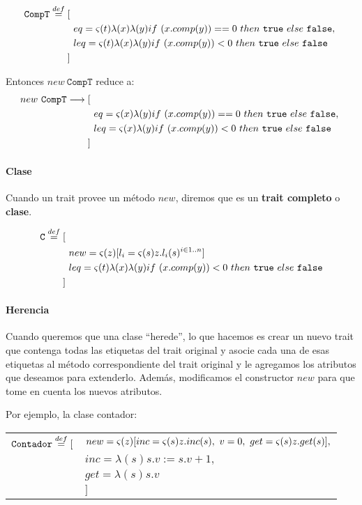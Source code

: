 \begin{align*}
	\texttt{CompT}\overset{def}{=} [~& \\ &eq = \varsigma(t)\lambda(x)\lambda(y)if~ (x.comp(y)) == 0~ then~ \texttt{true}~ else~ \texttt{false},~\\
	&leq = \varsigma(t)\lambda(x)\lambda(y)if~ (x.comp(y)) < 0~ then~ \texttt{true}~ else~ \texttt{false} \\
	]~&
\end{align*}

Entonces $new~\texttt{CompT}$ reduce a:
\begin{align*}
new~\texttt{CompT}\longrightarrow [~& \\ &eq = \varsigma(x)\lambda(y)if~ (x.comp(y)) == 0~ then~ \texttt{true}~ else~ \texttt{false},~\\
&leq = \varsigma(x)\lambda(y)if~ (x.comp(y)) < 0~ then~ \texttt{true}~ else~ \texttt{false} \\
]~&
\end{align*}

\paragraph{Clase} Cuando un trait provee un método $new$, diremos que es un \textbf{trait completo} o \textbf{clase}.

\begin{align*}
\texttt{C}\overset{def}{=} [~& \\ &new = \varsigma(z)[l_i = \varsigma(s)z.l_i(s)^{i\in 1..n}]~\\
&leq = \varsigma(t)\lambda(x)\lambda(y)if~ (x.comp(y)) < 0~ then~ \texttt{true}~ else~ \texttt{false} \\
]~&
\end{align*}

\paragraph{Herencia} Cuando queremos que una clase ``herede'', lo que hacemos es crear un nuevo trait que contenga todas las etiquetas del trait original y asocie cada una de esas etiquetas al método correspondiente del trait original y le agregamos los atributos que deseamos para extenderlo. Además, modificamos el constructor $new$ para que tome en cuenta los nuevos atributos.

Por ejemplo, la clase contador:

\vspace*{5mm}
\begin{tabular}{ll}
$\texttt{Contador}\overset{def}{=} [$ &
$new = \varsigma(z)[inc = \varsigma(s)z.inc(s),~v = 0,~ get = \varsigma(s)z.get(s) ],$ \\
 & $inc = \lambda(s) s.v := s.v + 1,$ \\
 & $get = \lambda(s) s.v$ \\
  & $]$ \\
\end{tabular}

